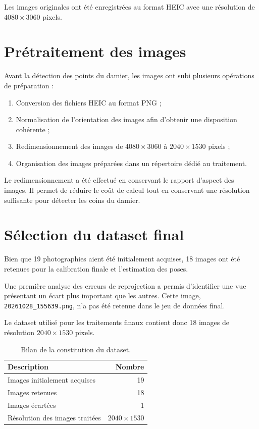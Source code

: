 \documentclass[12pt,a4paper]{report}
\begin{document}
Les images originales ont été enregistrées au format
HEIC avec une résolution de
$4080 \times 3060$ pixels.

\section{Prétraitement des images}

Avant la détection des points du damier, les images
ont subi plusieurs opérations de préparation :

\begin{enumerate}
    \item Conversion des fichiers HEIC au format PNG ;
    \item Normalisation de l'orientation des images
    afin d'obtenir une disposition cohérente ;
    \item Redimensionnement des images de
    $4080 \times 3060$ à
    $2040 \times 1530$ pixels ;
    \item Organisation des images préparées dans
    un répertoire dédié au traitement.
\end{enumerate}

Le redimensionnement a été effectué en conservant
le rapport d'aspect des images. Il permet de réduire
le coût de calcul tout en conservant une résolution
suffisante pour détecter les coins du damier.

\section{Sélection du dataset final}

Bien que 19 photographies aient été initialement
acquises, 18 images ont été retenues pour la
calibration finale et l'estimation des poses.

Une première analyse des erreurs de reprojection
a permis d'identifier une vue présentant un écart
plus important que les autres. Cette image,
\texttt{20261028\_155639.png}, n'a pas été retenue
dans le jeu de données final.

Le dataset utilisé pour les traitements finaux
contient donc 18 images de résolution
$2040 \times 1530$ pixels.

\begin{table}[H]
    \centering
    \caption{Bilan de la constitution du dataset.}
    \label{tab:dataset}
    \begin{tabular}{lr}
        \toprule
        \textbf{Description} & \textbf{Nombre} \\
        \midrule
        Images initialement acquises & 19 \\
        Images retenues & 18 \\
        Images écartées & 1 \\
        Résolution des images traitées & $2040 \times 1530$ \\
        \bottomrule
    \end{tabular}
\end{table}
\end{document}
